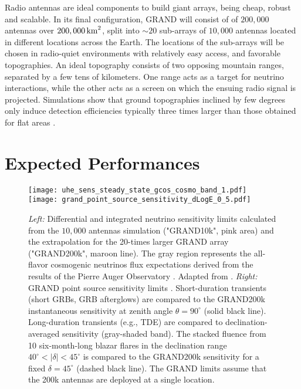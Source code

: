 \documentclass[a4paper,11pt]{article}
\begin{document}
Radio antennas are ideal components to build giant arrays, being cheap, robust and scalable. In its final configuration, GRAND will consist of of $200,000$ antennas over $200,000\,{\rm km}^2$, split into $\sim 20$ sub-arrays of $10,000$ antennas located in different locations across the Earth. The locations of the sub-arrays will be chosen in radio-quiet environments with relatively easy access, and favorable topographies. An ideal topography consists of two opposing mountain ranges, separated by a few tens of kilometers. One range acts as a target for neutrino interactions, while the other acts as a screen on which the ensuing radio signal is projected. Simulations show that ground topographies inclined by few degrees only induce detection efficiencies typically three times larger than those obtained for flat areas \cite{Decoene_2021}.


\section{Expected Performances}\label{section:performances}

\begin{figure}[t]
\centering
\texttt{[image: uhe\_sens\_steady\_state\_gcos\_cosmo\_band\_1.pdf]}
\texttt{[image: grand\_point\_source\_sensitivity\_dLogE\_0\_5.pdf]}
\caption{{\it Left:} Differential and integrated neutrino sensitivity limits calculated from the $10,000$ antennas simulation ("GRAND10k", pink area) and the extrapolation for the 20-times larger GRAND array ("GRAND200k", maroon line). The gray region represents the all-flavor cosmogenic neutrinos flux expectations derived from the results of the Pierre Auger Observatory \cite{AlvesBatista:2018zui}. Adapted from \cite{GRAND20}. {\it Right:} GRAND point source sensitivity limits \cite{GRAND20}. Short-duration transients (short GRBs, GRB afterglows) are compared to the GRAND200k instantaneous sensitivity at zenith angle $\theta = 90^\circ$ (solid black line). Long-duration transients (e.g., TDE) are compared to declination-averaged sensitivity (gray-shaded band). The stacked fluence from 10 six-month-long blazar flares in the declination range $40^\circ< |\delta| < 45^\circ$ is compared to the GRAND200k sensitivity for a fixed $\delta=45^\circ$ (dashed black line). The GRAND limits assume that the 200k antennas are deployed at a single location.  
}
\label{fig:nu_performances}
\end{figure}
\end{document}
